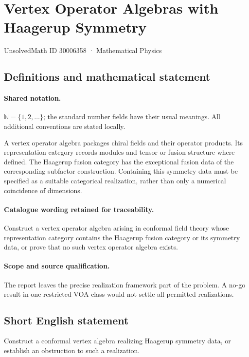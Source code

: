 \documentclass[11pt]{article}
\begin{document}
\setcounter{section}{30006357}
\section{Vertex Operator Algebras with Haagerup Symmetry}\label{30006358}
{\small UnsolvedMath ID 30006358 · Mathematical Physics}
\subsection{Definitions and mathematical statement}

\paragraph{Shared notation.}$\mathbb N=\{1,2,\ldots\}$; the standard number fields have their usual meanings. All additional conventions are stated locally.


A vertex operator algebra packages chiral fields and their operator products. Its representation category records modules and tensor or fusion structure where defined. The Haagerup fusion category has the exceptional fusion data of the corresponding subfactor construction. Containing this symmetry data must be specified as a suitable categorical realization, rather than only a numerical coincidence of dimensions.

\paragraph{Catalogue wording retained for traceability.}
Construct a vertex operator algebra arising in conformal field theory whose representation category contains the Haagerup fusion category or its symmetry data, or prove that no such vertex operator algebra exists.

\paragraph{Scope and source qualification.}The report leaves the precise realization framework part of the problem. A no-go result in one restricted VOA class would not settle all permitted realizations.
\subsection{Short English statement}
Construct a conformal vertex algebra realizing Haagerup symmetry data, or establish an obstruction to such a realization.
\end{document}
